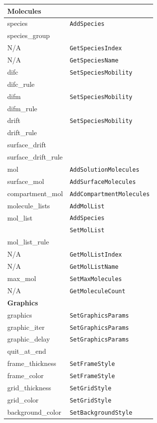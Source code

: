 \documentclass {scrbook}
\newcommand {\ttt} {\texttt}
\begin{document}
\begin{longtable}[c]{ll}
\hline
\multicolumn{2}{l}{\hspace{0.3in}\textbf{Molecules}}\\
\hline
species & \ttt{AddSpecies}\\
species\_group\\ %
N/A & \ttt{GetSpeciesIndex}\\
N/A & \ttt{GetSpeciesName}\\
difc & \ttt{SetSpeciesMobility}\\
difc\_rule \\ %
difm & \ttt{SetSpeciesMobility}\\
difm\_rule & \\ %
drift & \ttt{SetSpeciesMobility}\\
drift\_rule \\ %
surface\_drift \\ %
surface\_drift\_rule \\ %
mol & \ttt{AddSolutionMolecules}\\
surface\_mol & \ttt{AddSurfaceMolecules}\\
compartment\_mol & \ttt{AddCompartmentMolecules}\\
molecule\_lists & \ttt{AddMolList}\\
mol\_list & \ttt{AddSpecies}\\
& \ttt{SetMolList}\\
mol\_list\_rule \\ %
N/A & \ttt{GetMolListIndex}\\
N/A & \ttt{GetMolListName}\\
max\_mol & \ttt{SetMaxMolecules}\\
N/A & \ttt{GetMoleculeCount}\\
\hline
\multicolumn{2}{l}{\hspace{0.3in}\textbf{Graphics}}\\
\hline
graphics & \ttt{SetGraphicsParams}\\
graphic\_iter & \ttt{SetGraphicsParams}\\
graphic\_delay & \ttt{SetGraphicsParams}\\
quit\_at\_end \\ %
frame\_thickness & \ttt{SetFrameStyle}\\
frame\_color & \ttt{SetFrameStyle}\\
grid\_thickness & \ttt{SetGridStyle}\\
grid\_color & \ttt{SetGridStyle}\\
background\_color & \ttt{SetBackgroundStyle}\\

\end{longtable}
\end{document}
